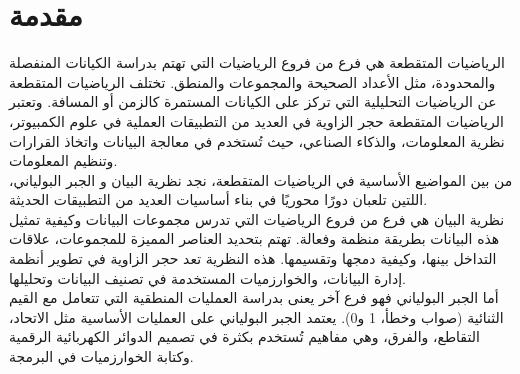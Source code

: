 \chapter*{مقدمة}
الرياضيات المتقطعة هي فرع من فروع الرياضيات التي تهتم بدراسة الكيانات المنفصلة والمحدودة، مثل الأعداد الصحيحة والمجموعات والمنطق. تختلف الرياضيات المتقطعة عن الرياضيات التحليلية التي تركز على الكيانات المستمرة كالزمن أو المسافة. وتعتبر الرياضيات المتقطعة حجر الزاوية في العديد من التطبيقات العملية في علوم الكمبيوتر، نظرية المعلومات، والذكاء الصناعي، حيث تُستخدم في معالجة البيانات واتخاذ القرارات وتنظيم المعلومات.\\
\noindent
من بين المواضيع الأساسية في الرياضيات المتقطعة، نجد نظرية البيان و الجبر البولياني، اللتين تلعبان دورًا محوريًا في بناء أساسيات العديد من التطبيقات الحديثة.\\
\noindent
نظرية البيان هي فرع من فروع الرياضيات التي تدرس مجموعات البيانات وكيفية تمثيل هذه البيانات بطريقة منظمة وفعالة. تهتم بتحديد العناصر المميزة للمجموعات، علاقات التداخل بينها، وكيفية دمجها وتقسيمها. هذه النظرية تعد حجر الزاوية في تطوير أنظمة إدارة البيانات، والخوارزميات المستخدمة في تصنيف البيانات وتحليلها.\\
\noindent
أما الجبر البولياني فهو فرع آخر يعنى بدراسة العمليات المنطقية التي تتعامل مع القيم الثنائية (صواب وخطأ، 1 و0). يعتمد الجبر البولياني على العمليات الأساسية مثل الاتحاد، التقاطع، والفرق، وهي مفاهيم تُستخدم بكثرة في تصميم الدوائر الكهربائية الرقمية وكتابة الخوارزميات في البرمجة.